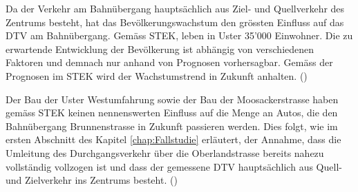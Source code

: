 Da der Verkehr am Bahnübergang hauptsächlich aus Ziel- und Quellverkehr des Zentrums besteht, hat das Bevölkerungswachstum den grössten Einfluss auf das DTV am Bahnübergang. Gemäss STEK, leben in Uster 35'000 Einwohner. Die zu erwartende Entwicklung der Bevölkerung ist abhängig von verschiedenen Faktoren und demnach nur anhand von Prognosen vorhersagbar. Gemäss der Prognosen im STEK wird der Wachstumstrend in Zukunft anhalten. (\cite{STEK})

Der Bau der Uster Westumfahrung sowie der Bau der Moosackerstrasse haben gemäss STEK keinen nennenswerten Einfluss auf die Menge an Autos, die den Bahnübergang Brunnenstrasse in Zukunft passieren werden. Dies folgt, wie im ersten Abschnitt des Kapitel \ref{chap:Fallstudie} erläutert, der Annahme, dass die Umleitung des Durchgangsverkehr über die Oberlandstrasse bereits nahezu vollständig vollzogen ist und dass der gemessene DTV hauptsächlich aus Quell- und Zielverkehr ins Zentrums besteht.  (\cite{STEK})

\newpage


%

